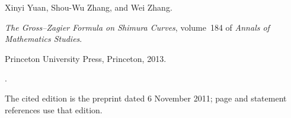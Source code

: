 Xinyi Yuan, Shou-Wu Zhang, and Wei Zhang.

\newblock \emph{The Gross--Zagier Formula on Shimura Curves}, volume~184 of
  \emph{Annals of Mathematics Studies}.

\newblock Princeton University Press, Princeton, 2013.

\newblock {}.

\newblock The cited edition is the preprint dated 6 November 2011;
  page and statement references use that edition.
